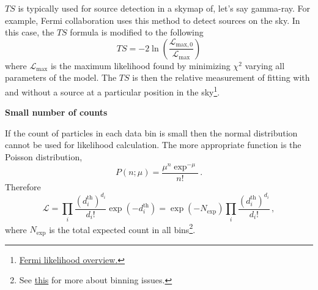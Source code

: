 \documentclass[11pt,aps,prd,onecolumn,floatfix, tightenlines,shownopacs,showkeys,preprintnumbers,nofootinbib, longbibliography,notitlepage]{revtex4-1}
\newcommand{\dth}{d^\mathrm{th}}
\newcommand{\lik}{\mathcal{L}}
\begin{document}
	$TS$ is typically used for source detection in a skymap of, let's say gamma-ray. For example, Fermi collaboration uses this method to detect sources on the sky. In this case, the $TS$ formula is modified to the following
	\begin{equation}
	TS = -2\ln\left(\dfrac{\lik_\mathrm{max,0}}{\lik_\mathrm{max}}\right)
	\end{equation}
	where $\lik_\mathrm{max}$ is the maximum likelihood found by minimizing $\chi^2$ varying all parameters of the model. The $TS$ is then the relative measurement of fitting with and without a source at a particular position in the sky\footnote{\href{https://fermi.gsfc.nasa.gov/ssc/data/analysis/documentation/Cicerone/Cicerone\_Likelihood/Likelihood\_overview.html}{Fermi likelihood overview.}}.
	\bigskip
	
	\textbf{Small number of counts}
	
	If the count of particles in each data bin is small then the normal distribution cannot be used for likelihood calculation. The more appropriate function is the Poisson distribution,
	\begin{equation}
	P(n;\mu) = \dfrac{\mu^n \exp^{-\mu}}{n!}\,.
	\end{equation}
	Therefore
	\begin{equation}
	\lik = \prod_i \dfrac{(\dth_i)^{d_i} }{d_i!} \exp(-\dth_i) = \exp(-N_\mathrm{exp}) \prod_i \dfrac{(\dth_i)^{d_i}}{d_i!}\,,
	\end{equation}
	where $N_\mathrm{exp}$ is the total expected count in all bins\footnote{See \href{https://fermi.gsfc.nasa.gov/ssc/data/analysis/documentation/Cicerone/Cicerone\_Likelihood/Likelihood\_formula.html}{this} for more about binning issues.}.
\end{document}
